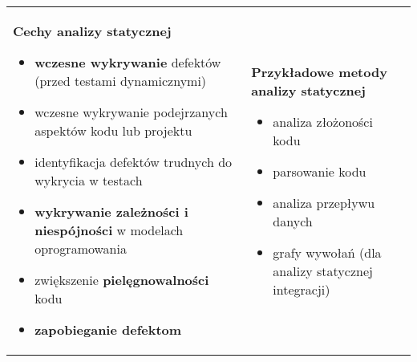 \documentclass[../main.tex]{subfiles}
\begin{document}
    \begin{table}[H]
        \begin{center}
            \begin{tabular}{p{8cm} p{8cm}}
                \textbf{Cechy analizy statycznej}
                \begin{itemize}
                    \item \textbf{wczesne wykrywanie} defektów (przed testami dynamicznymi)
                    \item wczesne wykrywanie podejrzanych aspektów kodu lub projektu
                    \item identyfikacja defektów trudnych do wykrycia w testach
                    \item \textbf{wykrywanie zależności i niespójności} w modelach oprogramowania
                    \item zwiększenie \textbf{pielęgnowalności} kodu
                    \item \textbf{zapobieganie defektom}
                \end{itemize}
                &
                \textbf{Przykładowe metody analizy statycznej}
                \begin{itemize}
                    \item analiza złożoności kodu
                    \item parsowanie kodu
                    \item analiza przepływu danych
                    \item grafy wywołań (dla analizy statycznej integracji)
                \end{itemize}
            \end{tabular}
        \end{center}
    \end{table}
\end{document}
